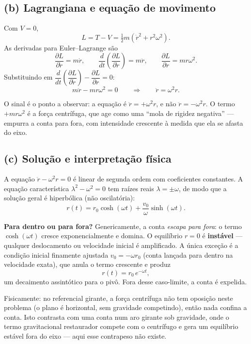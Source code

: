 \documentclass{article}
\begin{document}
\subsection*{(b) Lagrangiana e equação de movimento}

Com $V = 0$,
\[
L = T - V = \tfrac{1}{2}m\left(\dot r^2 + r^2\omega^2\right).
\]
As derivadas para Euler--Lagrange são
\[
\frac{\partial L}{\partial \dot r} = m\dot r,
\qquad
\frac{d}{dt}\!\left(\frac{\partial L}{\partial \dot r}\right) = m\ddot r,
\qquad
\frac{\partial L}{\partial r} = m r\omega^2.
\]
Substituindo em $\dfrac{d}{dt}\!\left(\dfrac{\partial L}{\partial \dot r}\right) - \dfrac{\partial L}{\partial r} = 0$:
\[
m\ddot r - m r\omega^2 = 0
\qquad\Longrightarrow\qquad
\ddot r = \omega^2 r.
\]

O sinal é o ponto a observar: a equação é $\ddot r = +\omega^2 r$, e não $\ddot r = -\omega^2 r$.
O termo $+mr\omega^2$ é a força centrífuga, que age como uma ``mola de rigidez
negativa'' — empurra a conta para fora, com intensidade crescente à medida que ela
se afasta do eixo.

\subsection*{(c) Solução e interpretação física}

A equação $\ddot r - \omega^2 r = 0$ é linear de segunda ordem com coeficientes
constantes. A equação característica $\lambda^2 - \omega^2 = 0$ tem raízes reais
$\lambda = \pm\omega$, de modo que a solução geral é hiperbólica (não oscilatória):
\[
r(t) = r_0\cosh(\omega t) + \frac{v_0}{\omega}\sinh(\omega t).
\]

\textbf{Para dentro ou para fora?} Genericamente, a conta \textit{escapa para fora}:
o termo $\cosh(\omega t)$ cresce exponencialmente e domina. O equilíbrio $r = 0$ é
\textbf{instável} — qualquer deslocamento ou velocidade inicial é amplificado. A
única exceção é a condição inicial finamente ajustada $v_0 = -\omega r_0$ (conta
lançada para dentro na velocidade exata), que anula o termo crescente e produz
\[
r(t) = r_0\, e^{-\omega t},
\]
um decaimento assintótico para o pivô. Fora desse caso-limite, a conta é expelida.

Fisicamente: no referencial girante, a força centrífuga não tem oposição neste
problema (o plano é horizontal, sem gravidade competindo), então nada confina a
conta. Isto contrasta com uma conta num aro girante sob gravidade, onde o termo
gravitacional restaurador compete com o centrífugo e gera um equilíbrio estável
fora do eixo — aqui esse contrapeso não existe.
\end{document}
